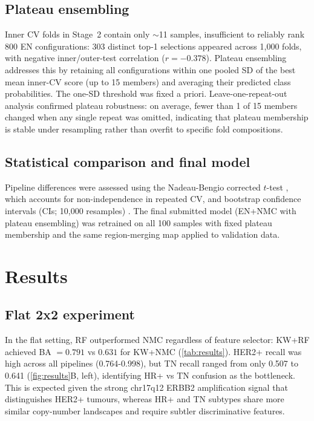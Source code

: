 \documentclass[11pt,a4paper,twocolumn]{article}
\begin{document}
\subsection{Plateau ensembling}
\label{sec:plateau-method}

Inner CV folds in Stage~2 contain only $\sim$11 samples, insufficient to reliably rank 800 EN configurations: 303 distinct top-1 selections appeared across 1,000 folds, with negative inner/outer-test correlation ($r = -0.378$). Plateau ensembling addresses this by retaining all configurations within one pooled SD of the best mean inner-CV score (up to 15 members) and averaging their predicted class probabilities. The one-SD threshold was fixed a priori. Leave-one-repeat-out analysis confirmed plateau robustness: on average, fewer than 1 of 15 members changed when any single repeat was omitted, indicating that plateau membership is stable under resampling rather than overfit to specific fold compositions.

\subsection{Statistical comparison and final model}
\label{sec:stats}

Pipeline differences were assessed using the Nadeau-Bengio corrected $t$-test \citep{nadeaubengio2003}, which accounts for non-independence in repeated CV, and bootstrap confidence intervals (CIs; 10,000 resamples) \citep{bouckaert2004evaluating}. The final submitted model (EN+NMC with plateau ensembling) was retrained on all 100 samples with fixed plateau membership and the same region-merging map applied to validation data.



\section{Results}
\label{sec:results}

\subsection{Flat 2x2 experiment}
\label{sec:results-flat}

In the flat setting, RF outperformed NMC regardless of feature selector: KW+RF achieved BA $= 0.791$ vs $0.631$ for KW+NMC (\autoref{tab:results}). HER2+ recall was high across all pipelines (0.764-0.998), but TN recall ranged from only 0.507 to 0.641 (\autoref{fig:results}B, left), identifying HR+ vs TN confusion as the bottleneck. This is expected given the strong chr17q12 ERBB2 amplification signal that distinguishes HER2+ tumours, whereas HR+ and TN subtypes share more similar copy-number landscapes and require subtler discriminative features.
\end{document}
